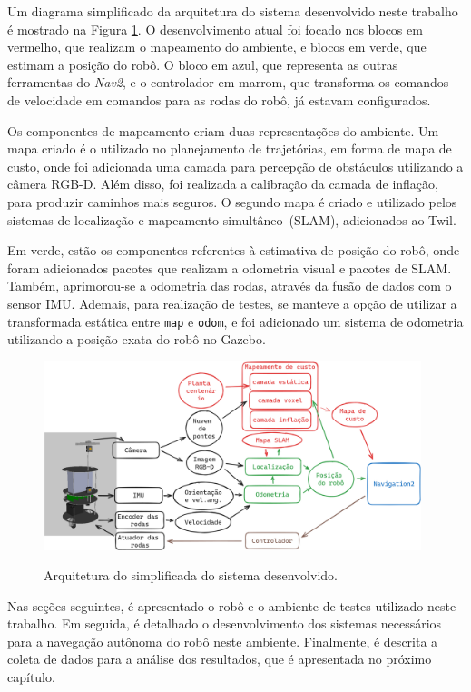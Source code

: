 \documentclass[repeatfields,xlists,xpacks,oneside,yearsonly]{ufrgscca}
\begin{document}
Um diagrama simplificado da arquitetura do sistema desenvolvido neste
trabalho é mostrado na Figura \ref{fig:arq_trabalho}. O
desenvolvimento atual foi focado nos blocos em vermelho, que realizam
o mapeamento do ambiente, e blocos em verde, que estimam a posição do
robô. O bloco em azul, que representa as outras ferramentas do
\textit{Nav2}, e o controlador em marrom, que transforma os comandos
de velocidade em comandos para as rodas do robô, já estavam
configurados.

Os componentes de mapeamento criam duas representações do ambiente.
Um mapa criado é o utilizado no planejamento de trajetórias, em forma
de mapa de custo, onde foi adicionada uma camada para percepção de
obstáculos utilizando a câmera RGB-D. Além disso, foi realizada a
calibração da camada de inflação, para produzir caminhos mais
seguros. O segundo mapa é criado e utilizado pelos sistemas de
localização e mapeamento simultâneo~(SLAM), adicionados ao Twil.

Em verde, estão os componentes referentes à estimativa de posição do
robô, onde foram adicionados pacotes que realizam a odometria visual
e pacotes de SLAM. Também, aprimorou-se a odometria das rodas,
através da fusão de dados com o sensor IMU. Ademais, para realização
de testes, se manteve a opção de utilizar a transformada estática
entre \texttt{map} e \texttt{odom}, e foi adicionado um sistema de
odometria utilizando a posição exata do robô no Gazebo.

\begin{figure}[H]
    {
        \centering
        \caption{Arquitetura do simplificada do sistema desenvolvido.}
        \label{fig:arq_trabalho}
        \includegraphics[width=0.98\textwidth]{arquitetura_simplificadav4.png}\\
    }
\end{figure}

Nas seções seguintes, é apresentado o robô e o ambiente de testes
utilizado neste trabalho. Em seguida, é detalhado o desenvolvimento
dos sistemas necessários para a navegação autônoma do robô neste
ambiente. Finalmente, é descrita a coleta de dados para a análise dos
resultados, que é apresentada no próximo capítulo.
\end{document}
